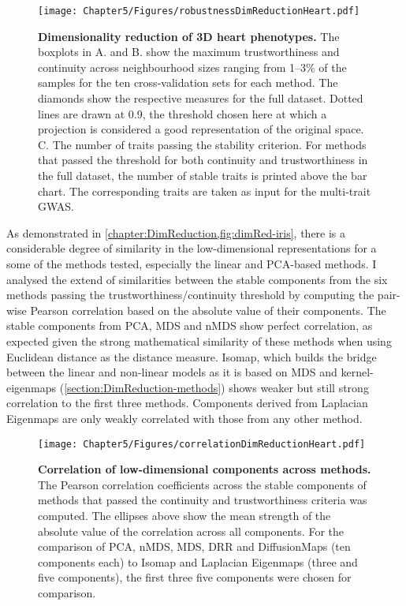\begin{figure}[h!]
	\centering
	\texttt{[image: Chapter5/Figures/robustnessDimReductionHeart.pdf]}
	\caption[\textbf{Dimensionality reduction of 3D heart phenotypes. }]{\textbf{Dimensionality reduction of 3D heart phenotypes. } The boxplots in A. and B. show the maximum trustworthiness and continuity across neighbourhood sizes ranging from \numrange{1}{3}\% of the samples for the ten cross-validation sets for each method. The diamonds show the respective measures for the full dataset. Dotted lines are drawn at \num{0.9}, the threshold chosen here at which a projection is considered a good representation of the original space. C. The number of traits passing the stability criterion. For methods that passed the threshold for both continuity and trustworthiness in the full dataset, the number of stable traits is printed above the bar chart. The corresponding traits are taken as input for the multi-trait GWAS.}
	 	\label{fig:dimRed-heart}
\end{figure}
%
As demonstrated in \cref{chapter:DimReduction,fig:dimRed-iris}, there is a considerable degree of similarity in the low-dimensional representations for a some of the methods tested, especially the linear and PCA-based methods. I analysed the extend of similarities between the stable components from the six methods passing the trustworthiness/continuity threshold by computing the pair-wise Pearson correlation based on the absolute value of their components.  The stable components from PCA, MDS and nMDS show perfect correlation, as expected given the strong mathematical similarity of these methods when using Euclidean distance as the distance measure. Isomap, which builds the bridge between the linear and non-linear models as it is based on MDS and kernel-eigenmaps (\cref{section:DimReduction-methods}) shows weaker but still strong correlation to the first three methods. Components derived from Laplacian Eigenmaps are only weakly correlated with those from any other method. 
%
\begin{figure}[t]
	\centering
	\texttt{[image: Chapter5/Figures/correlationDimReductionHeart.pdf]}
	\caption[\textbf{Correlation of low-dimensional components across methods. }]{\textbf{Correlation of low-dimensional components across methods. } The Pearson correlation coefficients across the stable components of methods that passed the continuity and trustworthiness criteria was computed. The ellipses above show the mean strength of the absolute value of the correlation across all components. For the comparison of PCA, nMDS, MDS, DRR and DiffusionMaps (ten components each) to Isomap and Laplacian Eigenmaps (three and five components), the first three five components were chosen for comparison.}
	 	\label{fig:dimRed-correlation}
\end{figure}
